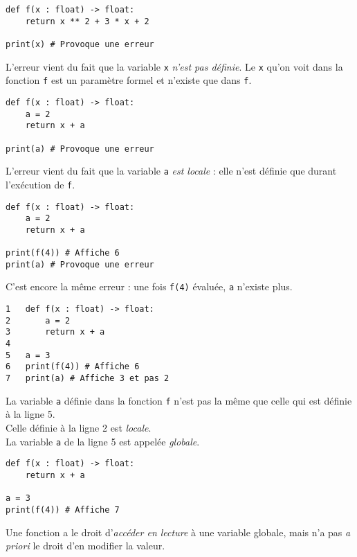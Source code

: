 \begin{pyc}
\begin{verbatim}
def f(x : float) -> float:
    return x ** 2 + 3 * x + 2
    
print(x) # Provoque une erreur
\end{verbatim}
\end{pyc}
L'erreur vient du fait que la variable \texttt{x} \textit{n'est pas définie}. Le \og \texttt{x} qu'on voit dans la fonction \texttt{f}\fg{} est un paramètre formel et n'existe que dans \texttt{f}.\\


\begin{pyc}
\begin{verbatim}
def f(x : float) -> float:
    a = 2
    return x + a

print(a) # Provoque une erreur
    \end{verbatim}
\end{pyc}
L'erreur vient du fait que la variable \texttt{a} \textit{est locale} : elle n'est définie que durant l'exécution de \texttt{f}.\\

\begin{pyc}
\begin{verbatim}
def f(x : float) -> float:
    a = 2
    return x + a

print(f(4)) # Affiche 6        
print(a) # Provoque une erreur
    \end{verbatim}
\end{pyc}
C'est encore la même erreur : une fois \texttt{f(4)} évaluée, \texttt{a} n'existe plus.\\

\begin{pyc}
\begin{verbatim}
1   def f(x : float) -> float:
2       a = 2
3       return x + a
4
5   a = 3
6   print(f(4)) # Affiche 6
7   print(a) # Affiche 3 et pas 2
\end{verbatim}
\end{pyc}

La variable \texttt{a} définie dans la fonction \texttt{f} n'est pas la même que celle qui est définie à la ligne 5.\\
Celle définie à la ligne 2 est \textit{locale}.\\
La variable \texttt{a} de la ligne 5 est appelée \textit{globale}.\\



\begin{pyc}
\begin{verbatim}
def f(x : float) -> float:
    return x + a
        
a = 3
print(f(4)) # Affiche 7
\end{verbatim}
\end{pyc}
\begin{aretenir}
Une fonction a le droit d'\textit{accéder en lecture} à une variable globale, mais n'a pas \textit{a priori} le droit d'en modifier la valeur.
\end{aretenir}

